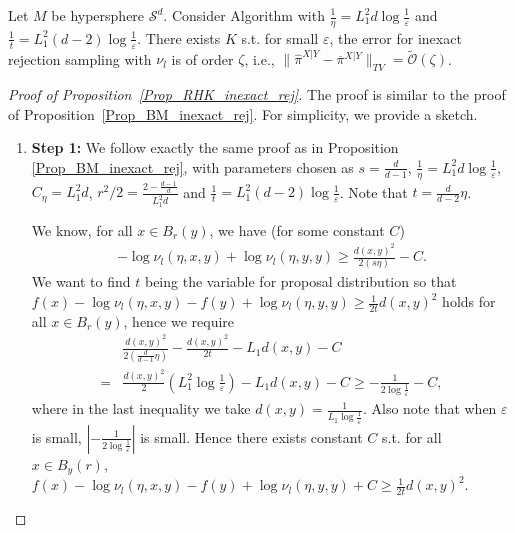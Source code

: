 \begin{proposition}\label{Prop_RHK_inexact_rej}
    Let $M$ be hypersphere $\mathcal{S}^{d}$.
    Consider Algorithm  with $\frac{1}{\eta }= L_{1}^{2} d \log \frac{1}{\varepsilon} $
    and $\frac{1}{t} = L_{1}^{2}(d-2)  \log \frac{1}{\varepsilon}$.
    There exists $K$ s.t. 
    for small $\varepsilon$, the error for inexact rejection sampling with $\nu_{l}$ is of order $\zeta$, i.e., 
    $\|\hat{\pi}^{X|Y} - \overline{\pi}^{X|Y}\|_{TV} = \tilde{\mathcal{O}}(\zeta)$.
\end{proposition}
\begin{proof}[Proof of Proposition~\ref{Prop_RHK_inexact_rej}]
    The proof is similar to the proof of Proposition~\ref{Prop_BM_inexact_rej}. For simplicity, we provide a sketch.
    \begin{enumerate}
        \item \textbf{Step 1:} We follow  exactly the same proof as in Proposition \ref{Prop_BM_inexact_rej}, with parameters chosen as 
        $s = \frac{d}{d-1}$, $\frac{1}{\eta }= L_{1}^{2} d \log \frac{1}{\varepsilon} $, $C_{\eta} = L_{1}^{2} d$, 
        $r^{2}/2 = \frac{2-\frac{d-1}{d}}{L_{1}^{2} d}$ and 
        $\frac{1}{t} = L_{1}^{2}(d-2) \log \frac{1}{\varepsilon}$. Note that $t =\frac{d}{d-2} \eta $.

        We know, for all $x \in B_{r}(y)$, we have (for some constant $C$)
        \begin{align*}
                - \log \nu_{l}(\eta, x, y) + \log \nu_{l}(\eta, y, y) 
                \ge \frac{d(x, y)^{2}}{2(s\eta)} - C.
        \end{align*}
        We want to find $t$ being the variable for proposal distribution so that $f(x) - \log \nu_{l}(\eta, x, y) - f(y) + \log \nu_{l}(\eta, y, y) \ge \frac{1}{2t} d(x, y)^{2}$ holds for all $x \in B_{r}(y)$, 
        hence we require
        \begin{align*}
                &\frac{d(x, y)^{2}}{2(\frac{d}{d-1}\eta)} - \frac{d(x, y)^{2}}{2t} - L_{1}d(x, y) - C \\
                =& \frac{d(x, y)^{2}}{2}(L_{1}^{2}\log \frac{1}{\varepsilon})- L_{1}d(x, y) - C
                \ge -\frac{1}{2 \log \frac{1}{\varepsilon}} - C,
        \end{align*}
        where in the last inequality we take $d(x, y) = \frac{1}{L_{1}\log \frac{1}{\varepsilon}}$. 
        Also note that when $\varepsilon$ is small, $|-\frac{1}{2 \log \frac{1}{\varepsilon}}|$ is small.
        Hence there exists constant $C$ s.t. for all $x \in B_{y}(r)$, 
        $f(x) - \log \nu_{l}(\eta, x, y) - f(y) + \log \nu_{l}(\eta, y, y) + C \ge \frac{1}{2t} d(x, y)^{2}$.
        

\end{enumerate}
\end{proof}
